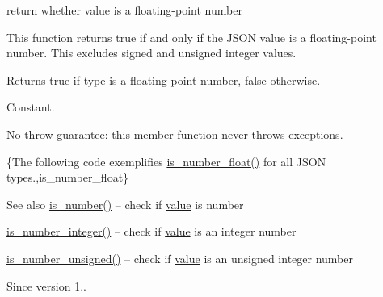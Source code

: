 return whether value is a floating-\/point number 

This function returns true if and only if the J\+S\+ON value is a floating-\/point number. This excludes signed and unsigned integer values.

\begin{DoxyReturn}{Returns}
{\ttfamily true} if type is a floating-\/point number, {\ttfamily false} otherwise.
\end{DoxyReturn}
Constant.

No-\/throw guarantee\+: this member function never throws exceptions.

\{The following code exemplifies {\ttfamily \hyperlink{classnlohmann_1_1basic__json_a33b4bf898b857c962e798fc7f6e86e70}{is\+\_\+number\+\_\+float()}} for all J\+S\+ON types.,is\+\_\+number\+\_\+float\}

\begin{DoxySeeAlso}{See also}
\hyperlink{classnlohmann_1_1basic__json_a2b9852390abb4b1ef5fac6984e2fc0f3}{is\+\_\+number()} -- check if \hyperlink{classnlohmann_1_1basic__json_a404017aa52714a0a4bc79d5af7e4ad2b}{value} is number 

\hyperlink{classnlohmann_1_1basic__json_abac8af76067f1e8fdca9052882c74428}{is\+\_\+number\+\_\+integer()} -- check if \hyperlink{classnlohmann_1_1basic__json_a404017aa52714a0a4bc79d5af7e4ad2b}{value} is an integer number 

\hyperlink{classnlohmann_1_1basic__json_abc7378cba0613a78b9aad1c8e7044bb0}{is\+\_\+number\+\_\+unsigned()} -- check if \hyperlink{classnlohmann_1_1basic__json_a404017aa52714a0a4bc79d5af7e4ad2b}{value} is an unsigned integer number
\end{DoxySeeAlso}
\begin{DoxySince}{Since}
version 1.. 
\end{DoxySince}

